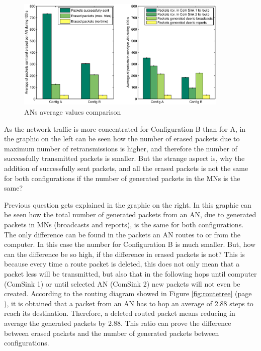 \begin{figure}[ht]
 \begin{center}
  \includegraphics[width=0.9\textwidth]{ANsConparison.eps}
 \end{center}
 \caption{\acp{AN} average values comparison}
 \label{fig:ANsConparison}
\end{figure}

As the network traffic is more concentrated for Configuration B than for A, in the graphic on the left can be seen how the number of erased 
packets due to maximum number of retransmissions is higher, and therefore the number of successfully transmitted packets is smaller. But the 
strange aspect is, why the addition of successfully sent packets, and all the erased packets is not the same for both configurations if the 
number of generated packets in the \acp{MN} is the same? 

Previous question gets explained in the graphic on the right. In this graphic can be seen how the total number of generated packets from an 
\ac{AN}, due to generated packets in \acp{MN} (broadcasts and reports), is the same for both configurations. The only difference can be 
found in the packets an \ac{AN} routes to or from the computer. In this case the number for Configuration B is much smaller. But, how can 
the difference be so high, if the difference in erased packets is not? This is because every time a route packet is deleted, this does not only
mean that a packet less will be transmitted, but also that in the following hops until computer (ComSink 1) or until selected \ac{AN} (ComSink
2) new packets will not even be created. According to the routing diagram showed in Figure \ref{fig:routetree} (page \pageref{fig:routetree}), it is
obtained that a packet from an \ac{AN} has to hop an average of 2.88 steps to reach its destination. Therefore, a deleted 
routed packet means reducing in average the generated packets by 2.88. This ratio can prove the difference between erased packets
and the number of generated packets between configurations.

